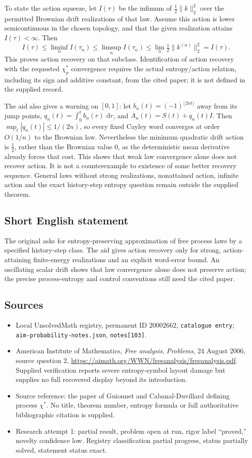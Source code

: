 \documentclass[11pt]{article}
\newcommand{\dd}{\,\mathrm{d}}
\begin{document}
To state the action squeeze, let $I(\tau)$ be the infimum of $\tfrac12\|k\|_2^2$ over the permitted Brownian drift realizations of that law. Assume this action is lower semicontinuous in the chosen topology, and that the given realization attains $I(\tau)<\infty$. Then
\[
I(\tau)\leq\liminf_n I(\tau_n)\leq\limsup_n I(\tau_n)
\leq\lim_n\tfrac12\|k^{(n)}\|_2^2=I(\tau).
\]
This proves action recovery on that subclass. Identification of action recovery with the requested $\chi_p^*$ convergence requires the actual entropy/action relation, including its sign and additive constant, from the cited paper; it is not defined in the supplied record.

The aid also gives a warning on $[0,1]$: let $b_n(t)=(-1)^{\lfloor2nt\rfloor}$ away from its jump points, $q_n(t)=\int_0^t b_n(r)\,\dd r$, and $A_n(t)=S(t)+q_n(t)I$. Then $\sup_t|q_n(t)|\leq1/(2n)$, so every fixed Cayley word converges at order $O(1/n)$ to the Brownian law. Nevertheless the minimum quadratic drift action is $\tfrac12$, rather than the Brownian value $0$, as the deterministic mean derivative already forces that cost. This shows that weak law convergence alone does not recover action. It is not a counterexample to existence of some better recovery sequence. General laws without strong realizations, nonattained action, infinite action and the exact history-step entropy question remain outside the supplied theorem.
\subsection{Short English statement}
The original asks for entropy-preserving approximation of free process laws by a specified history-step class. The aid gives action recovery only for strong, action-attaining finite-energy realizations and an explicit word-error bound. An oscillating scalar drift shows that law convergence alone does not preserve action; the precise process-entropy and control conventions still need the cited paper.
\subsection{Sources}
\begin{itemize}
\item Local UnsolvedMath registry, permanent ID $20002662$, \texttt{catalogue entry}; \texttt{aim-probability-notes.json}, \texttt{notes[103]}.
\item American Institute of Mathematics, \emph{Free analysis}, \emph{Problems}, 24 August 2006, source question 2, \url{https://aimath.org/WWN/freeanalysis/freeanalysis.pdf}. Supplied verification reports severe entropy-symbol layout damage but supplies no full recovered display beyond its introduction.
\item Source reference: the paper of Guionnet and Cabanal-Duvillard defining process $\chi^*$. No title, theorem number, entropy formula or full authoritative bibliographic citation is supplied.
\item Research attempt 1: partial result, problem open at run, rigor label ``proved,'' novelty confidence low. Registry classification partial progress, status partially solved, statement status exact.
\end{itemize}
\end{document}
